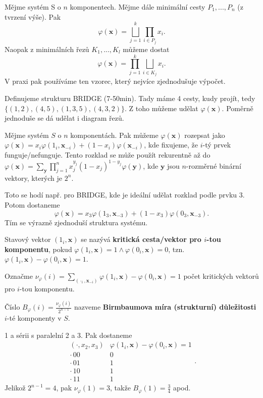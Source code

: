 \begin{theorem}
	Mějme systém S o $n$ komponentech. Mějme dále minimální cesty $P_1,...,P_n$ (z tvrzení výše). Pak $$ \varphi(\textbf{x})=\bigsqcup_{j=1}^k \prod_{i\in P_j} x_i.$$
	Naopak z minimálních řezů $K_1,...,K_l$ můžeme dostat
	$$ \varphi(\textbf{x})= \prod_{j=1}^k \bigsqcup_{i\in K_j} x_i.$$
	V praxi pak používáme ten vzorec, který nejvíce zjednodušuje výpočet.
\end{theorem}

\begin{corollary}
	Definujeme strukturu BRIDGE (7-50min). Tady máme 4 cesty, kudy projít, tedy $\{(1,2),(4,5),(1,3,5),(4,3,2)\}$. Z toho můžeme udělat $\varphi(\textbf{x})$. Poměrně jednoduše se dá udělat i diagram řezů.
\end{corollary}

\begin{theorem}
	Mějme systém $S$ o $n$ komponentách. Pak můžeme $\varphi(\textbf{x})$ rozepsat jako $\varphi(\textbf{x})=x_i\varphi(1_i,\textbf{x}_{-i})+(1-x_i)\varphi(\textbf{x}_{-i})$, kde fixujeme, že $i$-tý prvek funguje/nefunguje. Tento rozklad se může použít rekurentně až do $\varphi(\textbf{x})=\sum_{\textbf{y}}\prod_{j=1}^n x_j^{y_j}(1-x_j)^{1-y_j}\varphi(\textbf{y})$, kde $\textbf{y}$ jsou $n$-rozměrné binární vektory, kterých je $2^n$.
\end{theorem}

Toto se hodí např. pro BRIDGE, kde je ideální udělat rozklad podle prvku 3. Potom dostaneme 
$$ \varphi(\textbf{x})=x_3\varphi(1_3,\textbf{x}_{-3})+(1-x_3)\varphi(0_3,\textbf{x}_{-3}). $$ 
Tím se výrazně zjednoduší struktura systému.

\begin{define}
	Stavový vektor $(1_i,\textbf{x})$ se nazývá \textbf{kritická cesta/vektor pro $i$-tou komponentu}, pokud $\varphi(1_i,\textbf{x})=1\wedge \varphi(0_i,\textbf{x})=0 $, tzn. $\varphi(1_i,\textbf{x})-\varphi(0_i,\textbf{x})=1$.
	
	Označme $\nu_\varphi(i)=\sum_{(\cdot_i,\textbf{x}_{-i})} \varphi(1_i,\textbf{x})-\varphi(0_i,\textbf{x})=1$ počet kritických vektorů pro $i$-tou komponentu.
	
	Číslo $B_\varphi(i)=\frac{\nu_\varphi(i)}{2^{n-1}}$ nazveme \textbf{Birmbaumova míra (strukturní) důležitosti} $i$-té komponenty v $S$.
\end{define}

\begin{example}
	1 a sérii s paralelní 2 a 3. Pak dostaneme
	$$\begin{array}{c|c}
		(\cdot,x_2,x_3) & \varphi(1_i,\textbf{x})-\varphi(0_i,\textbf{x})=1 \\\hline
		\cdot\,00 & 0 \\
		\cdot\,01 & 1 \\
		\cdot\,10 & 1 \\
		\cdot\,11 & 1 
	\end{array}.$$
	Jelikož $2^{n-1}=4$, pak $\nu_\varphi(1)=3$, takže $B_\varphi(1)=\frac{3}{4}$ apod.
	
\end{example}


